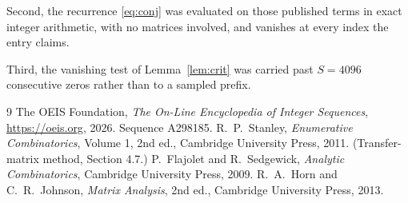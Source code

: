 \documentclass[11pt,a4paper]{article}
\theoremstyle{plain}
\theoremstyle{definition}
\begin{document}
Second, the recurrence \eqref{eq:conj} was evaluated on those published terms in exact
integer arithmetic, with no matrices involved, and vanishes at every index the entry claims.

Third, the vanishing test of Lemma~\ref{lem:crit} was carried past $S=4096$ consecutive
zeros rather than to a sampled prefix.

\begin{thebibliography}{9}
 The OEIS Foundation, \emph{The On-Line Encyclopedia of Integer
Sequences}, \url{https://oeis.org}, 2026. Sequence A298185.
 R.~P.~Stanley, \emph{Enumerative Combinatorics}, Volume 1, 2nd ed.,
Cambridge University Press, 2011. (Transfer-matrix method, Section 4.7.)
 P.~Flajolet and R.~Sedgewick, \emph{Analytic Combinatorics}, Cambridge
University Press, 2009.
 R.~A.~Horn and C.~R.~Johnson, \emph{Matrix Analysis}, 2nd ed., Cambridge
University Press, 2013.
\end{thebibliography}
\end{document}

